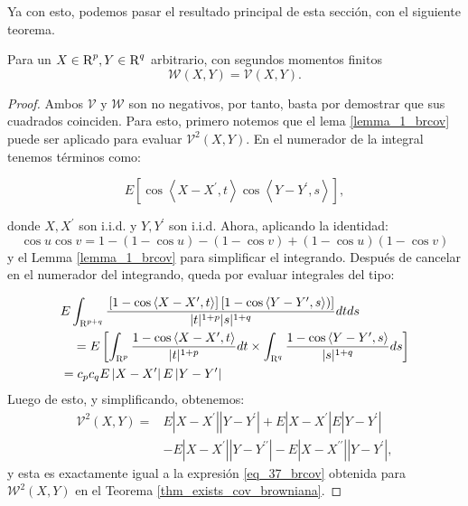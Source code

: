 	Ya con esto, podemos pasar el resultado principal de esta secci\'on, con el siguiente teorema.
	

	\begin{thm}\label{thm_8_brcov}
		Para un $X \in \textsc{R}^p, Y \in \textsc{R}^q$ arbitrario, con segundos momentos finitos
			$$
			\mathcal{W}(X, Y)=\mathcal{V}(X, Y) .
			$$
			\end{thm}
	
	\begin{proof}
		
	Ambos $\mathcal{V}$ y $\mathcal{W}$ son no negativos, por tanto, basta por demostrar que sus cuadrados coinciden. Para esto, primero notemos que el lema \ref{lemma_1_brcov} puede ser aplicado para evaluar $\mathcal{V}^2(X, Y)$. En el numerador de la integral tenemos t\'erminos como:
	
	$$
	E\left[\cos \left\langle X-X^{\prime}, t\right\rangle \cos \left\langle Y-Y^{\prime}, s\right\rangle\right],
	$$

	donde $X, X^{\prime}$ son i.i.d. y $Y, Y^{\prime}$ son i.i.d. Ahora, aplicando la identidad:
	$$
	\cos u \cos v=1-(1-\cos u)-(1-\cos v)+(1-\cos u)(1-\cos v)
	$$
	y el Lemma \ref{lemma_1_brcov} para simplificar el integrando. Despu\'es de cancelar en el numerador del integrando, queda por evaluar integrales del tipo:

	$$
	\begin{aligned}
	& E \int_{\textsc{R}^{p+q}} \frac{\left.\left[1-\cos \left\langle X-X^{\prime}, t\right\rangle\right]\left[1-\cos \left\langle Y-Y^{\prime}, s\right\rangle\right)\right]}{|t|^{1+p}|s|^{1+q}} d t d s \\
	& \quad=E\left[\int_{\textsc{R}^p} \frac{1-\cos \left\langle X-X^{\prime}, t\right\rangle}{|t|^{1+p}} d t \times \int_{\textsc{R}^q} \frac{1-\cos \left\langle Y-Y^{\prime}, s\right\rangle}{|s|^{1+q}} d s\right] \\
	& =c_p c_q E\left|X-X^{\prime}\right| E\left|Y-Y^{\prime}\right|
	\end{aligned}
	$$
	Luego de esto, y simplificando, obtenemos:
	$$
	\begin{aligned}
	\mathcal{V}^2(X, Y)= & E\left|X-X^{\prime}\right|\left|Y-Y^{\prime}\right|+E\left|X-X^{\prime}\right| E\left|Y-Y^{\prime}\right| \\
	& -E\left|X-X^{\prime}\right|\left|Y-Y^{\prime \prime}\right|-E\left|X-X^{\prime \prime}\right|\left|Y-Y^{\prime}\right|,
	\end{aligned}
	$$
	y esta es exactamente igual a la expresi\'on \ref{eq_37_brcov} obtenida para $\mathcal{W}^2(X, Y)$ en el Teorema \ref{thm_exists_cov_browniana}.
	\end{proof}

